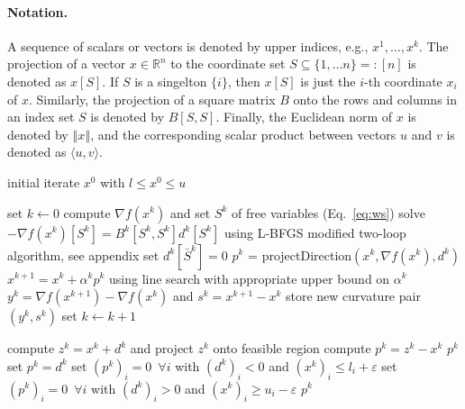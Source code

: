 \documentclass[letterpaper]{article} %
\newcommand{\setR}{\mathbb{R}}
\newcommand{\vareps}{\varepsilon}
\newcommand{\sprod}[2]{\langle{#1}, {#2}\rangle}
\newcommand{\norm}[1]{\left\Vert#1\right\Vert}
\begin{document}
\paragraph{Notation.} A sequence of scalars or vectors is denoted by upper indices, e.g., $x^1,\ldots,x^k$. The projection of a vector $x\in\setR^n$ to the coordinate set $S\subseteq\{1, \ldots n\}=:[n]$ is denoted as $x[S]$. If $S$ is a singelton $\{i\}$, then $x[S]$ is just the $i$-th coordinate $x_i$ of $x$. Similarly, the projection of a square matrix $B$ onto the rows and columns in an index set $S$ is denoted by $B[S, S]$. Finally, the Euclidean norm of $x$ is denoted by $\norm{x}$, and the corresponding scalar product between vectors $u$ and $v$ is denoted as $\sprod{u}{v}$.

\begin{algorithm}[h!]
   \caption{GPU-efficient L-BFGS-B Method}
   \label{algo:1}
\begin{algorithmic}[1]
    initial iterate $x^0$ with $l\leq x^0\leq u$

    set $k\leftarrow 0$
   \REPEAT
   \STATE compute $\nabla f(x^k)$ and set $S^k$ of free variables (Eq.~\ref{eq:ws})
   \STATE solve $-\nabla f(x^k)[S^k]=B^k[S^k, S^k] d^k[S^k]$ using\newline
   \hspace*{2.5ex}\mbox{L-BFGS} modified two-loop algorithm, see appendix \label{line:0}
   \STATE set $d^k[\bar S^k] = 0$
   \STATE $p^k$ = projectDirection$(x^k, \nabla f(x^k), d^k)$
   \STATE $x^{k+1} = x^k + \alpha^k p^k$ using line search with appropriate \newline
   \hspace*{2.2ex} upper bound on $\alpha^k$
   \STATE $y^k=\nabla f(x^{k+1}) - \nabla f(x^k)$ and $s^k=x^{k+1}-x^{k}$
   \STATE store new curvature pair $(y^k, s^k)$ %
   \STATE set $k\leftarrow k+1$
\end{algorithmic}
\end{algorithm}

\begin{algorithm}[h!]
   \caption{projectDirection$(x^k, \nabla f(x^k), d^k)$}
   \label{algo:2}
\begin{algorithmic}[1]
  \STATE compute $z^k = x^k+d^k$ and project $z^k$ onto feasible region
  \STATE compute $p^k = z^k - x^k$
  \IF{$\sprod{p^k}{\nabla f(x^k)} \leq -\vareps \|p^k\|^2$ and $\|p^k\|^2 \geq \vareps$} \label{line:1}
  \RETURN $p^k$
  \ELSE
  \STATE set $p^k = d^k$ \label{line:2}
  \STATE set $(p^k)_i = 0 \, \,\, \forall i$ with $ (d^k)_i < 0$ and $ (x^k)_i \leq l_i + \vareps$
  \STATE set $(p^k)_i = 0 \, \,\, \forall i$ with $ (d^k)_i > 0$ and $ (x^k)_i \geq u_i - \vareps$ \label{line:3}
  \RETURN $p^k$
  \ENDIF
\end{algorithmic}
\end{algorithm}
\end{document}
